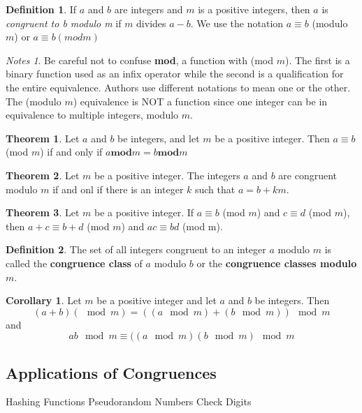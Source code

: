 \documentclass[11pt]{book} %
\theoremstyle {definition}
\newtheorem {definition}{Definition}[section]
\newtheorem {theorem}{Theorem}[section]
\newtheorem {corollary}{Corollary}[section]
\theoremstyle {remark}
\newtheorem*{notes}{Notes}
\begin{document}
\begin{definition}
If $a$ and $b$ are integers and $m$ is a positive integers, then $a$ is \textit{congruent to b modulo m} if $m$ divides $a-b$. We use the notation $a \equiv b$ (modulo $m$) or $a \equiv b (mod m)$
\end {definition}

\begin{notes}
Be careful not to confuse \textbf{mod}, a function with (mod $m$). The first is a binary function used as an infix operator while the second is a qualification for the entire equivalence. Authors use different notations to mean one or the other. The (modulo $m$) equivalence is NOT a function since one integer can be in equivalence to multiple integers, modulo $m$.
\end{notes}

\begin{theorem}
Let $a$ and $b$ be integers, and let $m$ be a positive integer. Then $a   \equiv b$ (mod $m$) if and only if $a   \mathbf{mod} m = b   \mathbf{mod} m$ 
\end{theorem}

\begin{theorem}
Let $m$ be a positive integer. The integers $a$ and $b$ are congruent modulo $m$ if and onl if there is an integer $k$ such that $a=b+km$.
\end{theorem}


\begin{theorem}
Let $m$ be a positive integer. If $a \equiv b$ (mod $m$) and $c \equiv d$ (mod $m$), then $a+c \equiv b+d$ (mod $m$) and $ac \equiv bd$ (mod m).
\end{theorem}

\begin{definition}
The set of all integers congruent to an integer $a$ modulo $m$ is called the \textbf{congruence class} of $a$ modulo $b$ or the \textbf{congruence classes modulo $m$}.
\end{definition}

\begin{corollary}
Let $m$ be a positive integer and let $a$ and $b$ be integers. Then
$$(a+b) (\mod {m}) = ((a \mod {m}) + (b \mod  {m} )) \mod {m}$$
and
$$ab \mod{m} \equiv ((a \mod{m})(b \mod{m}) \mod{m}$$
\end{corollary}



  \subsection {Applications of Congruences}
Hashing Functions
Pseudorandom Numbers
Check Digits
\end{document}
